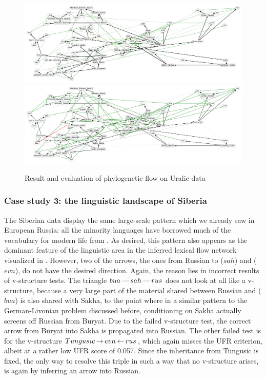 \begin{figure}
 \includegraphics[width=\textwidth]{figures/uralic-fs-ufr-ml-multi.pdf}
 \vspace*{5mm}
 \includegraphics[width=\textwidth]{figures/uralic-fs-ufr-ml-multi-eval.pdf}
 \caption{Result and evaluation of phylogenetic flow on Uralic data}
 \label{uralic-result-phylo}
 \end{figure}
 
 \subsubsection{Case study 3: the linguistic landscape of Siberia}
 The Siberian data display the same large-scale pattern which we already saw in European Russia: all the minority languages have borrowed much of the vocabulary for modern life from . As desired, this pattern also appears as the dominant feature of the linguistic area in the inferred lexical flow network visualized in . However, two of the arrows, the ones from Russian to  ($sah$) and  ($evn$), do not have the desired direction. Again, the reason lies in incorrect results of v-structure tests. The triangle $bua \kern 2pt\hbox{---}\kern 2pt sah \kern 2pt\hbox{---}\kern 2pt rus$ does not look at all like a v-structure, because a very large part of the material shared between Russian and  ($bua$) is also shared with Sakha, to the point where in a similar pattern to the German-Livonian problem discussed before, conditioning on Sakha actually screens off Russian from Buryat. Due to the failed v-structure test, the correct arrow from Buryat into Sakha is propagated into Russian. The other failed test is for the v-structure $Tungusic \kern 2pt\hbox{$\rightarrow$}\kern 2pt evn \kern 2pt\hbox{$\leftarrow$}\kern 2pt rus$, which again misses the UFR criterion, albeit at a rather low UFR score of 0.057. Since the inheritance from Tungusic is fixed, the only way to resolve this triple in such a way that no v-structure arises, is again by inferring an arrow into Russian.
 
